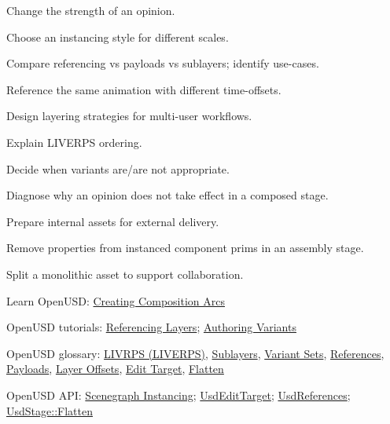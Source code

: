 
\begin{Objectives}
  \item Change the strength of an opinion.
  \item Choose an instancing style for different scales.
  \item Compare referencing vs payloads vs sublayers; identify use-cases.
  \item Reference the same animation with different time-offsets.
  \item Design layering strategies for multi-user workflows.
  \item Explain LIVERPS ordering.
  \item Decide when variants are/are not appropriate.
  \item Diagnose why an opinion does not take effect in a composed stage.
  \item Prepare internal assets for external delivery.
  \item Remove properties from instanced component prims in an assembly stage.
  \item Split a monolithic asset to support collaboration.
\end{Objectives}

\begin{Resources}
  \item Learn OpenUSD: \href{https://docs.nvidia.com/learn-openusd/latest/creating-composition-arcs/index.html}{Creating Composition Arcs}
  \item OpenUSD tutorials: \href{https://openusd.org/release/tut_referencing_layers.html}{Referencing Layers}; \href{https://openusd.org/release/tut_authoring_variants.html}{Authoring Variants}
  \item OpenUSD glossary: \href{https://openusd.org/release/glossary.html#liverps-strength-ordering}{LIVRPS (LIVERPS)}, \href{https://openusd.org/release/glossary.html#usdglossary-sublayers}{Sublayers}, \href{https://openusd.org/release/glossary.html#usdglossary-variantset}{Variant Sets}, \href{https://openusd.org/release/glossary.html#usdglossary-references}{References}, \href{https://openusd.org/release/glossary.html#usdglossary-payload}{Payloads}, \href{https://openusd.org/release/glossary.html#layer-offset}{Layer Offsets}, \href{https://openusd.org/release/glossary.html#edittarget}{Edit Target}, \href{https://openusd.org/release/glossary.html#flatten}{Flatten}
  \item OpenUSD API: \href{https://openusd.org/release/api/_usd__page__scenegraph_instancing.html}{Scenegraph Instancing}; \href{https://openusd.org/release/api/class_usd_edit_target.html}{UsdEditTarget}; \href{https://openusd.org/release/api/class_usd_references.html}{UsdReferences}; \href{https://openusd.org/release/api/class_usd_stage.html}{UsdStage::Flatten}
\end{Resources}

